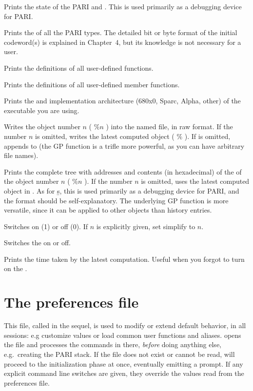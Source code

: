  Prints the state of the PARI  and .
This is used primarily as a debugging device for PARI.

 Prints the  of all the PARI
types. The detailed bit or byte format of the initial codeword(s) is
explained in Chapter~4, but its knowledge is not necessary for a 
user.

 Prints the definitions of all user-defined functions.

 Prints the definitions of all user-defined member functions.

 Prints the  and implementation architecture
(680x0, Sparc, Alpha, other) of the  executable you are using.

 Writes the object number
$n$ ( $\%n$ ) into the named file, in raw format. If the number $n$ is
omitted, writes the latest computed object ( $\%$ ). If  is
omitted, appends to  (the GP function  is a trifle more
powerful, as you can have arbitrary file names).

 Prints the complete tree with addresses and contents
(in hexadecimal) of the  of the object number
$n$ ( $\%n$ ). If the number $n$ is omitted, uses the latest computed object
in . As for \b{s}, this is used primarily as a debugging device for
PARI, and the format should be self-explanatory. The underlying GP
function  is more versatile, since it can be applied to other
objects than history entries.

 Switches  on (1) or off (0). If $n$
is explicitly given, set simplify to $n$.

\subseckbd{\#} Switches the  on or off.

\subseckbd{\#\#} Prints the time taken by the latest computation.
Useful when you forgot to turn on the .

\section{The preferences file}
\label{se:gprc}

This file, called  in the sequel, is used to modify or extend
 default behavior, in all  sessions: e.g customize
 values or load common user functions and aliases. 
opens the  file and processes the commands in there, \emph{before}
doing anything else, e.g.~creating the PARI stack. If the file does not exist
or cannot be read,  will proceed to the initialization phase at once,
eventually emitting a prompt. If any explicit command line switches are
given, they override the values read from the preferences file.

